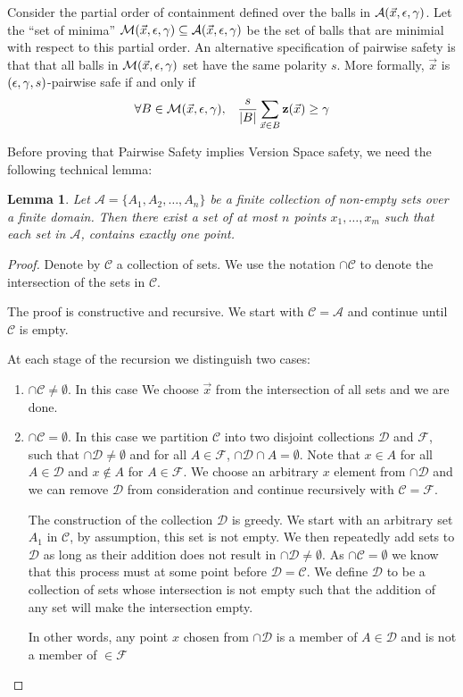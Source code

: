 \documentclass{article}
\newtheorem{lemma}[theorem]{Lemma}
\newcommand{\x}{\vec{x}}
\newcommand{\vz}{\mathbf{z}}
\newcommand{\cA}{\mathcal{A}}
\newcommand{\cC}{\mathcal{C}}
\newcommand{\cD}{\mathcal{D}}
\newcommand{\cF}{\mathcal{F}}
\begin{document}
Consider the partial order of containment defined over the balls in
$\AllSet$.
Let the ``set of minima'' $\MinSet \subseteq \AllSet$ be the set of balls that are
minimial with respect to this partial order. An alternative
specification of pairwise safety is that that all balls in $\MinSet$
set have the same polarity $s$. More formally, $\x$ is
$(\epsilon,\gamma,s)$-pairwise safe if and only if
\[
\forall B \in \MinSet,\;\;\; \frac{s}{|B|} \sum_{\x \in B} \vz(\x) \geq \edge 
 \]

Before proving that Pairwise Safety implies Version Space safety, we
need the following technical lemma:


\begin{lemma}
  Let $\cA=\{A_1,A_2,\ldots,A_n\}$ be a finite collection of non-empty sets over a finite
  domain. Then there exist a set of at most $n$ points
  $x_1,\ldots,x_m$ such that each set in $\cA$, contains exactly one point.
\end{lemma}
\begin{proof}
  Denote by $\cC$ a collection of sets. We use the notation $\cap \cC$
  to denote the intersection of the sets in $\cC$.

  The proof is constructive and recursive. We start with $\cC=\cA$ and
  continue until $\cC$ is empty.
  
  At each stage of the recursion we distinguish two cases:
  \begin{enumerate}
    \item $\cap \cC \neq \emptyset$. In this case
      We choose $\x$ from the intersection of all sets and we are
      done.
    \item $\cap \cC = \emptyset$. In this case we partition $\cC$ into
      two disjoint collections $\cD$ and $\cF$, such that $\cap \cD
      \neq \emptyset$ and for all $A \in \cF$, $\cap \cD \cap A =
      \emptyset$. Note that $x \in A$ for all $A \in \cD$ and $x \notin A$
      for $A \in \cF$. We choose an arbitrary $x$ element from $\cap
      \cD$ and we can remove $\cD$ from consideration
      and continue recursively with $\cC = \cF$.

      The construction of the collection $\cD$ is greedy. We start
      with an arbitrary set $A_1$ in $\cC$, by assumption, this set is
      not empty. We then repeatedly add sets to $\cD$ as long as their
      addition does not result in $\cap \cD \neq \emptyset$. As $\cap
      \cC=\emptyset$ we know that this process must at some point before
      $\cD=\cC$. We define $\cD$ to be a collection of sets whose
      intersection is not empty such that the addition of any set will
      make the intersection empty.

      In other words, any point $x$ chosen from $\cap \cD$ is a member
      of $A \in \cD$ and is not a member of $ \in \cF$
    \end{enumerate}
\end{proof}
\end{document}
